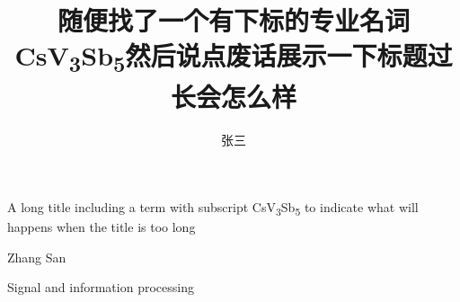 
\title{
    随便找了一个有下标的专业名词CsV\textsubscript{3}Sb\textsubscript{5}然后说点废话展示一下标题过长会怎么样
}{
    A long title including a term with subscript CsV\textsubscript{3}Sb\textsubscript{5} to indicate what will happens when the title is too long
}
\author{张三}{Zhang San}
\subject{信号与信息处理}{Signal and information processing}
